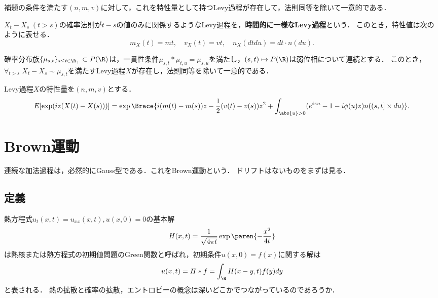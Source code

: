 \documentclass[uplatex,dvipdfmx]{jsreport}
\begin{document}
\begin{theorem}
    補題の条件を満たす$(n,m,v)$に対して，これを特性量として持つLevy過程が存在して，法則同等を除いて一意的である．
\end{theorem}

\begin{corollary}[時間的に一様な場合]
    $X_t-X_s\;(t>s)$の確率法則が$t-s$の値のみに関係するようなLevy過程を，\textbf{時間的に一様なLevy過程}という．
    このとき，特性値は次のように表せる．
    \[m_X(t)=mt,\quad v_X(t)=vt,\quad n_X(dtdu)=dt\cdot n(du).\]
\end{corollary}

\begin{corollary}[構成定理]\label{cor-construction-of-Levy-process}
    確率分布族$\{\mu_{s,t}\}_{s\le t\in\R_+}\subset P(\R)$は，一貫性条件$\mu_{s,t}*\mu_{t,u}=\mu_{s,u}$を満たし，$(s,t)\mapsto P(\R)$は弱位相について連続とする．
    このとき，$\forall_{t>s}\;X_t-X_s\sim\mu_{s,t}$を満たすLevy過程$X$が存在し，法則同等を除いて一意的である．
\end{corollary}

\begin{theorem}
    Levy過程$X$の特性量を$(n,m,v)$とする．
    \[E[\exp(iz(X(t)-X(s)))]=\exp\Brace{i(m(t)-m(s))z-\frac{1}{2}(v(t)-v(s))z^2+\int_{\abs{u}>0}(e^{izu}-1-i\phi(u)z)n((s,t]\times du)}.\]
\end{theorem}

\section{Brown運動}

\begin{tcolorbox}[colframe=ForestGreen, colback=ForestGreen!10!white,breakable,colbacktitle=ForestGreen!40!white,coltitle=black,fonttitle=\bfseries\sffamily,
title=]
    連続な加法過程は，必然的にGauss型である．これをBrown運動という．
    ドリフトはないものをまずは見る．
\end{tcolorbox}

\subsection{定義}

\begin{tcolorbox}[colframe=ForestGreen, colback=ForestGreen!10!white,breakable,colbacktitle=ForestGreen!40!white,coltitle=black,fonttitle=\bfseries\sffamily,
title=]
    熱方程式$u_t(x,t)=u_{xx}(x,t),u(x,0)=0$の基本解
    \[H(x,t)=\frac{1}{\sqrt{4\pi t}}\exp\paren{-\frac{x^2}{4t}}\]
    は熱核または熱方程式の初期値問題のGreen関数と呼ばれ，初期条件$u(x,0)=f(x)$に関する解は
    \[u(x,t)=H*f=\int_\R H(x-y,t)f(y)dy\]
    と表される．
    熱の拡散と確率の拡散，エントロピーの概念は深いどこかでつながっているのであろうか．
\end{tcolorbox}
\end{document}
